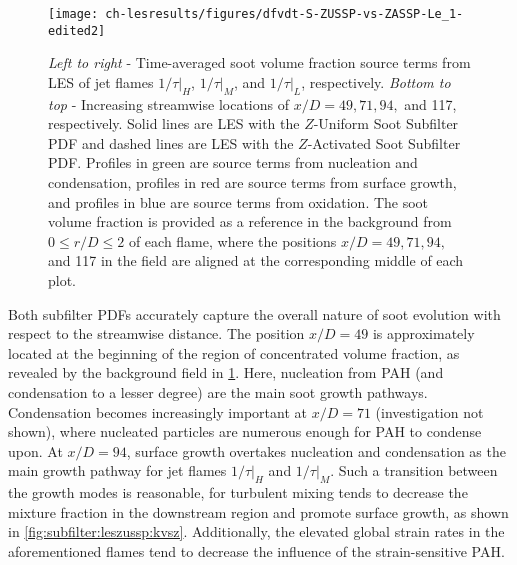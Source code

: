 \begin{figure}[H]
  \centering
  \texttt{[image: ch-lesresults/figures/dfvdt-S-ZUSSP-vs-ZASSP-Le\_1-edited2]}
  \caption[Radial \texorpdfstring{$\langle df_V/dt \rangle$}{<dfV/dt>} from LES with \texorpdfstring{$Z$}{Z}-Activated Soot Subfilter PDF]{\textit{Left to right} - Time-averaged soot volume fraction source terms from LES of jet flames $1/\tau|_H$, $1/\tau|_M$, and $1/\tau|_L$, respectively. \textit{Bottom to top} - Increasing streamwise locations of $x/D = 49, 71, 94,$ and 117, respectively. Solid lines are LES with the $Z$-Uniform Soot Subfilter PDF and dashed lines are LES with the $Z$-Activated Soot Subfilter PDF. Profiles in green are source terms from nucleation and condensation, profiles in red are source terms from surface growth, and profiles in blue are source terms from oxidation. The soot volume fraction is provided as a reference in the background from $0 \le r/D \le 2$ of each flame, where the positions $x/D = 49, 71, 94,$ and 117 in the field are aligned at the corresponding middle of each plot.}
  \label{fig:lesresults:zassp:radialdfvdt}
\end{figure}

Both subfilter PDFs accurately capture the overall nature of soot evolution with respect to the streamwise distance. The position $x/D = 49$ is approximately located at the beginning of the region of concentrated volume fraction, as revealed by the background field in \cref{fig:lesresults:zassp:radialdfvdt}. Here, nucleation from PAH (and condensation to a lesser degree) are the main soot growth pathways. Condensation becomes increasingly important at $x/D = 71$ (investigation not shown), where nucleated particles are numerous enough for PAH to condense upon. At $x/D = 94$, surface growth overtakes nucleation and condensation as the main growth pathway for jet flames $1/\tau|_H$ and $1/\tau|_M$. Such a transition between the growth modes is reasonable, for turbulent mixing tends to decrease the mixture fraction in the downstream region and promote surface growth, as shown in \cref{fig:subfilter:leszussp:kvsz}. Additionally, the elevated global strain rates in the aforementioned flames tend to decrease the influence of the strain-sensitive PAH. %


